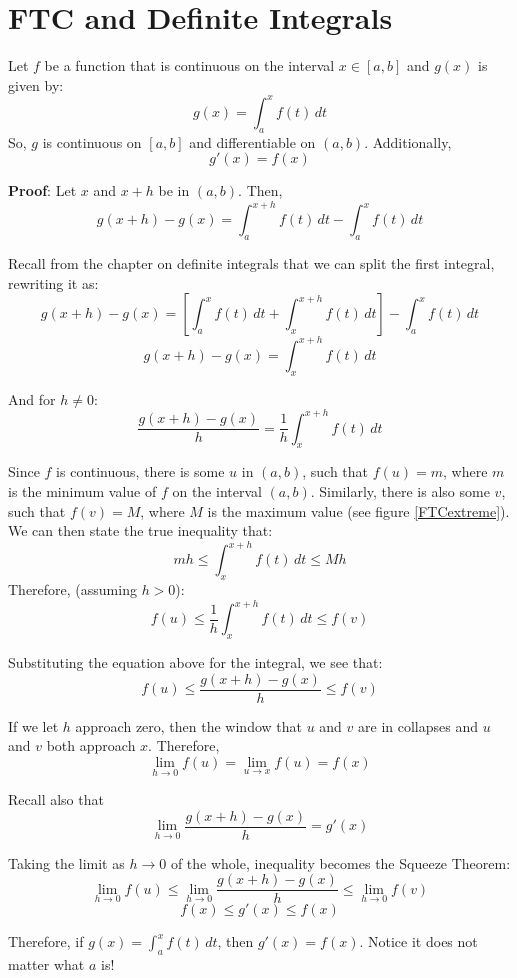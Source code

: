 \section{FTC and Definite Integrals}
Let $f$ be a function that is continuous on the interval $x \in \left[ a, b \right]$ and $g(x)$ is given by:
$$g(x) = \int_a^x f(t)\,dt$$
So, $g$ is continuous on $\left[a, b \right]$ and differentiable on $\left( a, b \right)$. Additionally, 
$$g'(x) = f(x)$$

\textbf{Proof}: Let $x$ and $x + h$ be in $\left( a, b \right)$. Then,
$$g(x + h) - g(x) = \int_a^{x + h} f(t)\,dt - \int_a^x f(t)\,dt$$

Recall from the chapter on definite integrals that we can split the first integral, rewriting it as:
$$g(x + h) - g(x) = \left[ \int_a^x f(t)\,dt + \int_x^{x + h} f(t)\,dt \right] - \int_a^x f(t)\,dt$$
$$g(x + h) - g(x) = \int_x^{x + h} f(t)\,dt$$

And for $h \neq 0$:
$$\frac{g(x + h) - g(x)}{h} = \frac{1}{h}\int_x^{x + h} f(t)\,dt$$

Since $f$ is continuous, there is some $u$ in $(a, b)$, such that $f(u) = m$, where $m$ is the minimum value of $f$ on the interval $(a, b)$. Similarly, there is also some $v$, such that $f(v) = M$, where $M$ is the maximum value (see figure \ref{FTCextreme}). We can then state the true inequality that:
$$mh \leq \int_x^{x + h} f(t) \,dt \leq Mh$$
Therefore, (assuming $h > 0$):
$$f(u) \leq \frac{1}{h} \int_x^{x + h} f(t)\,dt \leq f(v)$$

Substituting the equation above for the integral, we see that:
$$f(u) \leq \frac{g(x + h) - g(x)}{h} \leq f(v)$$

If we let $h$ approach zero, then the window that $u$ and $v$ are in collapses and $u$ and $v$ both approach $x$. Therefore, 
$$\lim_{h \to 0} f(u) = \lim_{u \to x} f(u) = f(x)$$

Recall also that 
$$\lim_{h \to 0} \frac{g(x + h) - g(x)}{h} = g'(x)$$

Taking the limit as $h \to 0$ of the whole, inequality becomes the Squeeze Theorem:
$$\lim_{h \to 0} f(u) \leq \lim_{h \to 0} \frac{g(x + h) - g(x)}{h} \leq \lim_{h \to 0} f(v)$$
$$f(x) \leq g'(x) \leq f(x)$$

Therefore, if $g(x) = \int_a^x f(t)\,dt$, then $g'(x) = f(x)$. Notice it does not matter what $a$ is!

